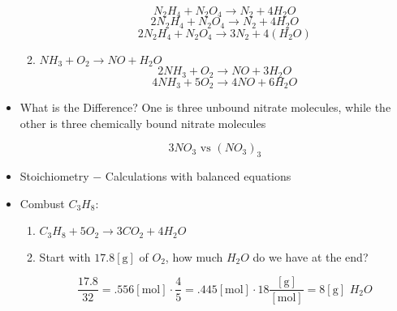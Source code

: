 \documentclass[12pt]{article}
\begin{document}
\begin{itemize}
\begin{enumerate}
        $$N_2H_4+N_2O_4\rightarrow N_2+4H_2O$$
        $$2N_2H_4+N_2O_4\rightarrow N_2+4H_2O$$
        $$2N_2H_4+N_2O_4\rightarrow 3N_2+4(H_2O)$$

      \item $NH_3+O_2\rightarrow NO +H_2O$
       $$2NH_3 + O_2\rightarrow NO + 3H_2O$$
       $$4NH_3 + 5O_2\rightarrow 4NO + 6H_2O$$

    \end{enumerate}

  \item What is the Difference? One is three unbound nitrate molecules, while the other is three chemically bound nitrate molecules

    $$3NO_3\text{ vs }(NO_3)_3$$

  \item Stoichiometry $-$ Calculations with balanced equations

  \item Combust $C_3H_8$:

    \begin{enumerate}

      \item $C_3H_8 + 5O_2\rightarrow 3CO_2 + 4H_2O$

      \item Start with $17.8[\si{\gram}]$ of $O_2$, how much $H_2O$ do we have at the end?

        $$\frac{17.8}{32}=.556[\si{\mole}]\cdot\frac{4}{5}=.445[\si{\mole}]\cdot18\frac{[\si{\gram}]}{[\si{\mole}]}=8[\si{\gram}]\,\,H_2O$$

    \end{enumerate}

\end{itemize}
\end{document}
